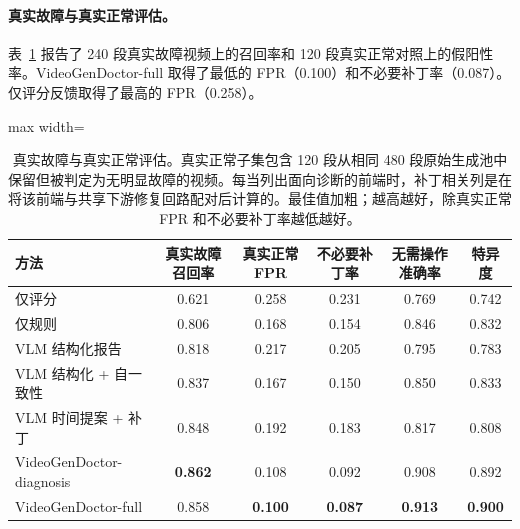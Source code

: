 \documentclass{article}
\begin{document}
\begin{table}[t]
\centering\scriptsize
\caption{真实故障与真实正常评估。真实正常子集包含 120 段从相同 480 段原始生成池中保留但被判定为无明显故障的视频。每当列出面向诊断的前端时，补丁相关列是在将该前端与共享下游修复回路配对后计算的。最佳值加粗；越高越好，除真实正常 FPR 和不必要补丁率越低越好。}
\paragraph{真实故障与真实正常评估。}
表~\ref{tab:real_normal_control} 报告了 240 段真实故障视频上的召回率和 120 段真实正常对照上的假阳性率。VideoGenDoctor-full 取得了最低的 FPR（0.100）和不必要补丁率（0.087）。仅评分反馈取得了最高的 FPR（0.258）。

\label{tab:real_normal_control}
\begin{adjustbox}{max width=\textwidth}
\begin{tabular}{lccccc}
\toprule
方法 & 真实故障召回率 & 真实正常 FPR & 不必要补丁率 & 无需操作准确率 & 特异度 \\
\midrule
仅评分 & 0.621 & 0.258 & 0.231 & 0.769 & 0.742 \\
仅规则 & 0.806 & 0.168 & 0.154 & 0.846 & 0.832 \\
VLM 结构化报告 & 0.818 & 0.217 & 0.205 & 0.795 & 0.783 \\
VLM 结构化 + 自一致性 & 0.837 & 0.167 & 0.150 & 0.850 & 0.833 \\
VLM 时间提案 + 补丁 & 0.848 & 0.192 & 0.183 & 0.817 & 0.808 \\
VideoGenDoctor-diagnosis & \textbf{0.862} & 0.108 & 0.092 & 0.908 & 0.892 \\
VideoGenDoctor-full & 0.858 & \textbf{0.100} & \textbf{0.087} & \textbf{0.913} & \textbf{0.900} \\
\bottomrule
\end{tabular}
\end{adjustbox}
\end{table}
\end{document}

